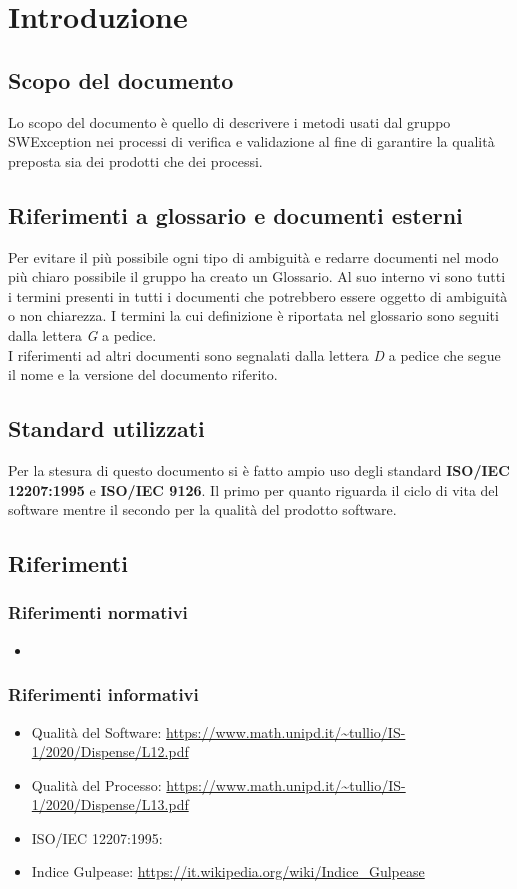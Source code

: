 \section{Introduzione} \label{_introduzione}
\subsection{Scopo del documento}
Lo scopo del documento è quello di descrivere i metodi usati dal gruppo SWException nei processi di verifica e validazione al fine di garantire la qualità preposta sia dei prodotti che dei processi.

\subsection{Riferimenti a glossario e documenti esterni}
Per evitare il più possibile ogni tipo di ambiguità e redarre documenti nel modo più chiaro possibile il gruppo ha creato un Glossario. Al suo interno vi sono tutti i termini presenti in tutti i documenti che potrebbero essere oggetto di ambiguità o non chiarezza. I termini la cui definizione è riportata nel glossario sono seguiti dalla lettera \textit{G} a pedice.\\
I riferimenti ad altri documenti sono segnalati dalla lettera \textit{D} a pedice che segue il nome e la versione del documento riferito.
\subsection{Standard utilizzati}
Per la stesura di questo documento si è fatto ampio uso degli standard \textbf{ISO/IEC 12207:1995} e \textbf{ISO/IEC 9126}. Il primo per quanto riguarda il ciclo di vita del software mentre il secondo per la qualità del prodotto software.
\subsection{Riferimenti}
\subsubsection{Riferimenti normativi}
\begin{itemize}
    \item {}
\end{itemize}
\subsubsection{Riferimenti informativi}
\begin{itemize}
    \item Qualità del Software: \url{https://www.math.unipd.it/~tullio/IS-1/2020/Dispense/L12.pdf}
    \item Qualità del Processo: \url{https://www.math.unipd.it/~tullio/IS-1/2020/Dispense/L13.pdf}
    \item ISO/IEC 12207:1995: 
    \item Indice Gulpease: \url{https://it.wikipedia.org/wiki/Indice_Gulpease}
\end{itemize}
